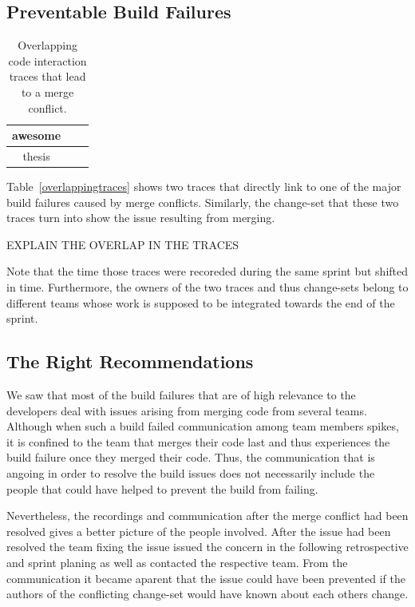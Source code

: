 \subsection{Preventable Build Failures}
\begin{table}[ht]
\begin{tabular}{ccc}
\toprule
awesome\\
\midrule
thesis\\
\bottomrule
\end{tabular}
\label{tab:overlappingtraces}
\caption{Overlapping code interaction traces that lead to a merge conflict.}
\end{table}

Table~\ref{overlappingtraces} shows two traces that directly link to one of the major build failures caused by merge conflicts.
Similarly, the change-set that these two traces turn into show the issue resulting from merging.

EXPLAIN THE OVERLAP IN THE TRACES

Note that the time those traces were recoreded during the same sprint but shifted in time.
Furthermore, the owners of the two traces and thus change-sets belong to different teams whose work is supposed to be integrated towards the end of the sprint.

\subsection{The Right Recommendations}
We saw that most of the build failures that are of high relevance to the developers deal with issues arising from merging code from several teams.
Although when such a build failed communication among team members spikes, it is confined to the team that merges their code last and thus experiences the build failure once they merged their code.
Thus, the communication that is angoing in order to resolve the build issues does not necessarily include the people that could have helped to prevent the build from failing.

Nevertheless, the recordings and communication after the merge conflict had been resolved gives a better picture of the people involved.
After the issue had been resolved the team fixing the issue issued the concern in the following retrospective and sprint planing as well as contacted the respective team.
From the communication it became aparent that the issue could have been prevented if the authors of the conflicting change-set would have known about each others change.


